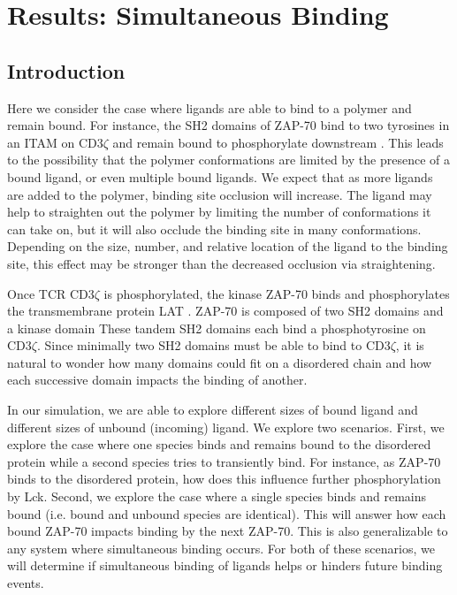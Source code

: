 \documentclass[../../AdvancementSummary.tex]{subfiles}
\begin{document}
\section{Results: Simultaneous Binding}
\label{sec: SimultaneousBinding}
\subsection{Introduction}

Here we consider the case where ligands are able to bind to a polymer and remain bound. For instance, the SH2 domains of ZAP-70 bind to two tyrosines in an ITAM on CD3$\zeta$ and remain bound to phosphorylate downstream \cite{Wang2010}. This leads to the possibility that the polymer conformations are limited by the presence of a bound ligand, or even multiple bound ligands. We expect that as more ligands are added to the polymer, binding site occlusion will increase. The ligand may help to straighten out the polymer by limiting the number of conformations it can take on, but it will also occlude the binding site in many conformations. Depending on the size, number, and relative location of the ligand to the binding site, this effect may be stronger than the decreased occlusion via straightening. 

Once TCR CD3$\zeta$ is phosphorylated, the kinase ZAP-70 binds and phosphorylates the transmembrane protein LAT \cite{Chan1992, Zhang1998}. ZAP-70 is composed of two SH2 domains and a kinase domain \cite{Chan1992, Wang2010} These tandem SH2 domains each bind a phosphotyrosine on CD3$\zeta$. Since minimally two SH2 domains must be able to bind to CD3$\zeta$, it is natural to wonder how many domains could fit on a disordered chain and how each successive domain impacts the binding of another. 

In our simulation, we are able to explore different sizes of bound ligand and different sizes of unbound (incoming) ligand. We explore two scenarios. First, we explore the case where one species binds and remains bound to the disordered protein while a second species tries to transiently bind. For instance, as ZAP-70 binds to the disordered protein, how does this influence further phosphorylation by Lck. Second, we explore the case where a single species binds and remains bound (i.e. bound and unbound species are identical). This will answer how each bound ZAP-70 impacts binding by the next ZAP-70. This is also generalizable to any system where simultaneous binding occurs. For both of these scenarios, we will determine if simultaneous binding of ligands helps or hinders future binding events. 
\end{document}
